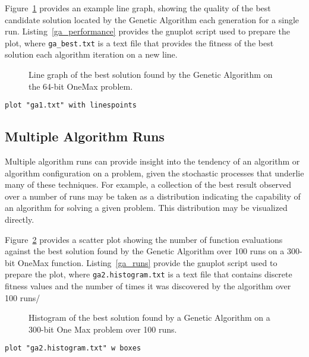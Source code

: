 \documentclass[a4paper, 11pt]{article}
\begin{document}
Figure~\ref{plot:ga1} provides an example line graph, showing the quality of the best candidate solution located by the Genetic Algorithm each generation for a single run. Listing~\ref{ga_performance} provides the gnuplot script used to prepare the plot, where \texttt{ga\_best.txt} is a text file that provides the fitness of the best solution each algorithm iteration on a new line.

\begin{figure}[htp]

\caption{Line graph of the best solution found by the Genetic Algorithm on the 64-bit OneMax problem.}
\label{plot:ga1}
\end{figure}

\begin{lstlisting}[caption=Plot of the best candidate solution found by the Genetic Algorithm each iteration, label=ga_performance]
plot "ga1.txt" with linespoints
\end{lstlisting}

\subsection{Multiple Algorithm Runs}
Multiple algorithm runs can provide insight into the tendency of an algorithm or algorithm configuration on a problem, given the stochastic processes that underlie many of these techniques. For example, a collection of the best result observed over a number of runs may be taken as a distribution indicating the capability of an algorithm for solving a given problem. This distribution may be visualized directly. 

Figure~\ref{plot:ga2} provides a scatter plot showing the number of function evaluations against the best solution found by the Genetic Algorithm over 100 runs on a 300-bit OneMax function. Listing~\ref{ga_runs} provide the gnuplot script used to prepare the plot, where \texttt{ga2.histogram.txt} is a text file that contains discrete fitness values and the number of times it was discovered by the algorithm over 100 runs/

\begin{figure}[htp]

\caption{Histogram of the best solution found by a Genetic Algorithm on a 300-bit One Max problem over 100 runs.}
\label{plot:ga2}
\end{figure}

\begin{lstlisting}[caption=Scatter plot of objective function evaluations against quality of best solution found over 100 runs of a Genetic Algorithm, label=ga_runs]
plot "ga2.histogram.txt" w boxes
\end{lstlisting}
\end{document}
